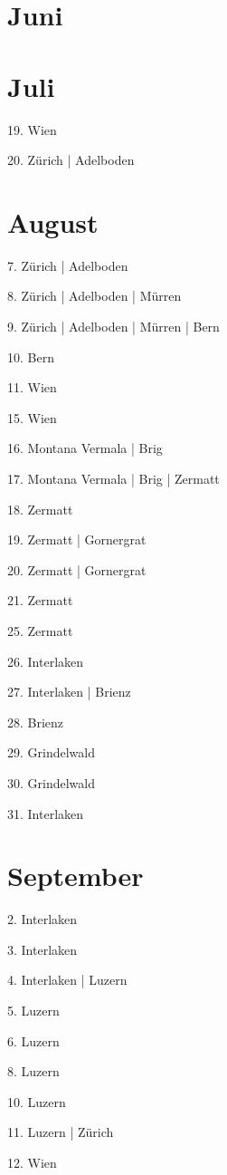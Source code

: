 \documentclass[twoside=false,titlepage=false,open=any, parskip=never, fontsize=10pt, headings=small, chapterprefix=false, appendixprefix=false, DIV=15]{scrbook}
\begin{document}
\begin{multicols}{3}
            \section*{Juni}
            \section*{Juli}
            19. Wien\par
            20. Zürich | Adelboden\par
            \section*{August}
            7. Zürich | Adelboden\par
            8. Zürich | Adelboden | Mürren\par
            9. Zürich | Adelboden | Mürren | Bern\par
            10. Bern\par
            11. Wien\par
            15. Wien\par
            16. Montana Vermala | Brig\par
            17. Montana Vermala | Brig | Zermatt\par
            18. Zermatt\par
            19. Zermatt | Gornergrat\par
            20. Zermatt | Gornergrat\par
            21. Zermatt\par
            25. Zermatt\par
            26. Interlaken\par
            27. Interlaken | Brienz\par
            28. Brienz\par
            29. Grindelwald\par
            30. Grindelwald\par
            31. Interlaken\par
            \section*{September}
            2. Interlaken\par
            3. Interlaken\par
            4. Interlaken | Luzern\par
            5. Luzern\par
            6. Luzern\par
            8. Luzern\par
            10. Luzern\par
            11. Luzern | Zürich\par
            12. Wien\par

\end{multicols}
\end{document}
